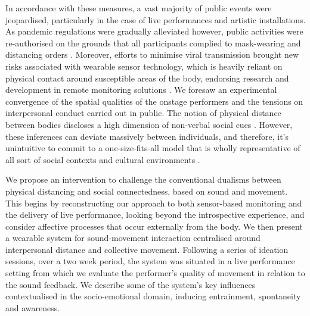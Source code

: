 In accordance with these measures, a vast majority of public events were jeopardised, particularly in the case of live performances and artistic installations. As pandemic regulations were gradually alleviated however, public activities were re-authorised on the grounds that all participants complied to mask-wearing and distancing orders \citep{direcao-geral_da_saude_dgs_covid-19_2020}. Moreover, efforts to minimise viral transmission brought new risks associated with wearable sensor technology, which is heavily reliant on physical contact around susceptible areas of the body, endorsing research and development in remote monitoring solutions \citep{seshadri_wearable_2020,jeong_continuous_2020}. We foresaw an experimental convergence of the spatial qualities of the onstage performers and the tensions on interpersonal conduct carried out in public. The notion of physical distance between bodies discloses a high dimension of non-verbal social cues \citep{kroczek_interpersonal_2020,vinciarelli_towards_2011,sundstrom_interpersonal_1976}. However, these inferences can deviate massively between individuals, and therefore, it’s unintuitive to commit to a one-size-fits-all model that is wholly representative of all sort of social contexts and cultural environments \citep{yu_investigation_2020,sorokowska_preferred_2017}.

We propose an intervention to challenge the conventional dualisms between physical distancing and social connectedness, based on sound and movement. This begins by reconstructing our approach to both sensor-based monitoring and the delivery of live performance, looking beyond the introspective experience, and consider affective processes that occur externally from the body. We then present a wearable system for sound-movement interaction centralised around interpersonal distance and collective movement. Following a series of ideation sessions, over a two week period, the system was situated in a live performance setting from which we evaluate the performer's quality of movement in relation to the sound feedback. We describe some of the system’s key influences contextualised in the socio-emotional domain, inducing entrainment, spontaneity and awareness.


